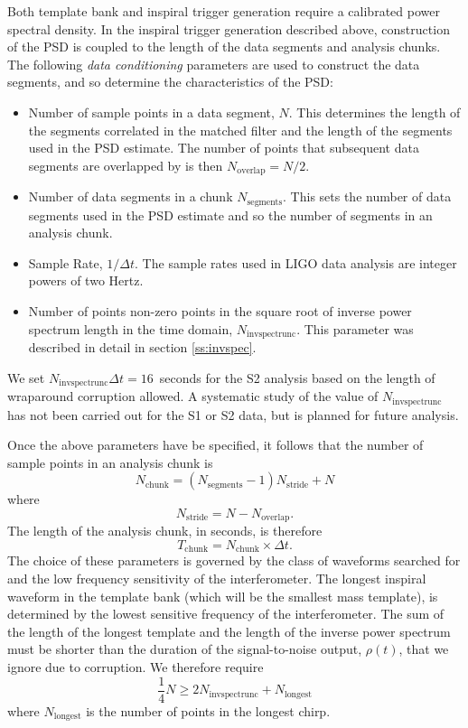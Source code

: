 Both template bank and inspiral trigger generation require a calibrated power
spectral density. In the inspiral trigger generation described above,
construction of the PSD is coupled to the length of the data segments and
analysis chunks. The following \emph{data conditioning} parameters are used to
construct the data segments, and so determine the characteristics of the PSD:
\begin{itemize}
\item Number of sample points in a data segment, $N$. This determines the
length of the segments correlated in the matched filter and the length of the
segments used in the PSD estimate. The number of points that subsequent data
segments are overlapped by is then $N_\mathrm{overlap} = N/2$.

\item Number of data segments in a chunk $N_\mathrm{segments}$. This sets the
number of data segments used in the PSD estimate and so the number of segments
in an analysis chunk.

\item Sample Rate, $1/\Delta t$. The sample rates used in LIGO data analysis
are integer powers of two Hertz.

\item Number of points non-zero points in the square root of inverse power
spectrum length in the time domain, $N_\mathrm{invspectrunc}$. This
parameter was described in detail in section \ref{ss:invspec}.
\end{itemize}
We set $N_\mathrm{invspectrunc} \Delta t = 16$~seconds for the S2 analysis
based on the length of wraparound corruption allowed. A systematic study of
the value of $N_\mathrm{invspectrunc}$ has not been carried out for the S1
or S2 data, but is planned for future analysis.

Once the above parameters have be specified, it follows that the number of
sample points in an analysis chunk is
\begin{equation}
N_\mathrm{chunk} = 
\left(N_\mathrm{segments} - 1 \right) N_\mathrm{stride} + N
\end{equation}
where 
\begin{equation}
N_\mathrm{stride} = N - N_\mathrm{overlap}.
\end{equation}
The length of the analysis chunk, in seconds, is therefore
\begin{equation}
T_\mathrm{chunk} = N_\mathrm{chunk} \times \Delta t.
\end{equation}
The choice of these parameters is governed by the class of waveforms searched
for and the low frequency sensitivity of the interferometer. The longest
inspiral waveform in the template bank (which will be the smallest mass
template), is determined by the lowest sensitive frequency of the
interferometer. The sum of the length of the longest template and the length
of the inverse power spectrum must be shorter than the duration of the
signal-to-noise output, $\rho(t)$, that we ignore due to corruption. We
therefore require
\begin{equation}
\frac{1}{4} N \ge 2 N_\mathrm{invspectrunc} + N_\mathrm{longest}
\end{equation}
where $N_\mathrm{longest}$ is the number of points in the longest chirp.

